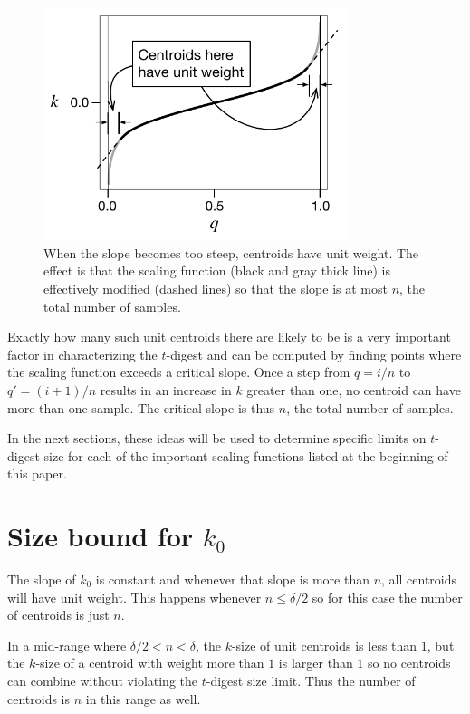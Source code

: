 \documentclass[11pt]{amsart}
\begin{document}
\begin{figure}[htbp] %
   \centering
   \includegraphics[width=3.5in]{../t-digest-paper/k-q-diagram/slope-limiting.pdf} 
   \caption{When the slope becomes too steep, centroids have unit weight. The effect is that the scaling function (black and gray thick line) is effectively modified (dashed lines) so that the slope is at most $n$, the total number of samples.  }
   \label{fig:k-q-slope}
\end{figure}
Exactly how many such unit centroids there are likely to be is a very important factor in characterizing the $t$-digest and can be computed by finding points where the scaling function exceeds a critical slope. Once a step from $q=i/n$ to $q'=(i+1)/n$ results in an increase in $k$ greater than one, no centroid can have more than one sample. The critical slope is thus $n$, the total number of samples.

In the next sections, these ideas will be used to determine specific limits on $t$-digest size for each of the important scaling functions listed at the beginning of this paper.

\section{Size bound for $k_0$}
The slope of $k_0$ is constant and whenever that slope is more than $n$, all centroids will have unit weight. This happens whenever $n \le \delta/2 $ so for this case the number of centroids is just $n$. 

In a mid-range where $\delta/2 < n < \delta$, the $k$-size of unit centroids is less than $1$, but the $k$-size of a centroid with weight more than $1$ is larger than $1$ so no centroids can combine without violating the $t$-digest size limit. Thus the number of centroids is $n$ in this range as well.
\end{document}
